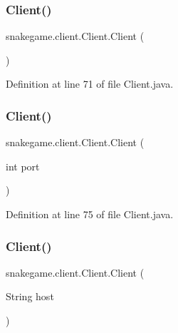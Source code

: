 \subsubsection{\texorpdfstring{Client()}{Client()}\hspace{0.1cm}{\footnotesize\ttfamily [2/4]}}
{\footnotesize\ttfamily snakegame.\+client.\+Client.\+Client (\begin{DoxyParamCaption}{ }\end{DoxyParamCaption})}



Definition at line 71 of file Client.\+java.

\mbox{\label{classsnakegame_1_1client_1_1_client_a4165aaf5d9c01f9b4b9416ea5a60c84d}} 
\subsubsection{\texorpdfstring{Client()}{Client()}\hspace{0.1cm}{\footnotesize\ttfamily [3/4]}}
{\footnotesize\ttfamily snakegame.\+client.\+Client.\+Client (\begin{DoxyParamCaption}\item[{int}]{port }\end{DoxyParamCaption})}



Definition at line 75 of file Client.\+java.

\mbox{\label{classsnakegame_1_1client_1_1_client_ac6777539a79418c36d55da33dc3451c5}} 
\subsubsection{\texorpdfstring{Client()}{Client()}\hspace{0.1cm}{\footnotesize\ttfamily [4/4]}}
{\footnotesize\ttfamily snakegame.\+client.\+Client.\+Client (\begin{DoxyParamCaption}\item[{String}]{host }\end{DoxyParamCaption})}



